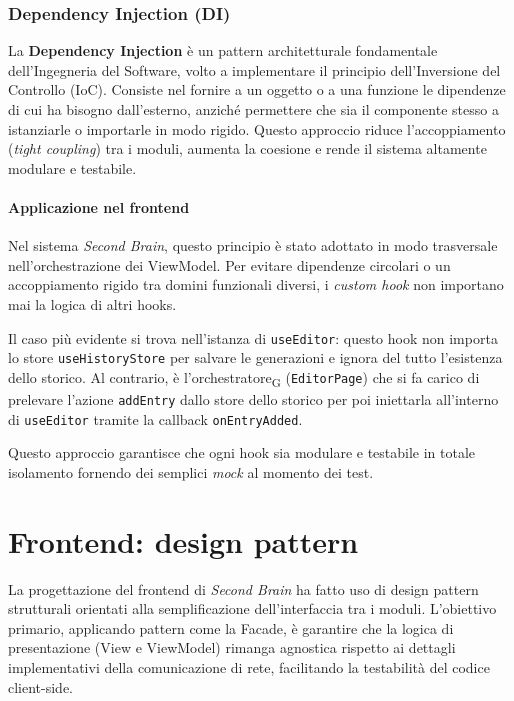 \documentclass[11pt,a4paper]{article}
\newcommand{\gls}[1]{#1\textsubscript{G}}
\begin{document}
\subsubsection{Dependency Injection (DI)}
La \textbf{Dependency Injection} è un pattern architetturale fondamentale dell'Ingegneria del Software, volto a implementare il principio dell'Inversione del Controllo (IoC). Consiste nel fornire a un oggetto o a una funzione le dipendenze di cui ha bisogno dall'esterno, anziché permettere che sia il componente stesso a istanziarle o importarle in modo rigido. Questo approccio riduce l'accoppiamento (\textit{tight coupling}) tra i moduli, aumenta la coesione e rende il sistema altamente modulare e testabile.

\paragraph{Applicazione nel frontend}
Nel sistema \textit{Second Brain}, questo principio è stato adottato in modo trasversale nell'orchestrazione dei ViewModel. Per evitare dipendenze circolari o un accoppiamento rigido tra domini funzionali diversi, i \textit{custom hook} non importano mai la logica di altri hooks.

Il caso più evidente si trova nell'istanza di \texttt{useEditor}: questo hook non importa lo store \texttt{useHistoryStore} per salvare le generazioni e ignora del tutto l'esistenza dello storico. Al contrario, è l'\gls{orchestratore} (\texttt{EditorPage}) che si fa carico di prelevare l'azione \texttt{addEntry} dallo store dello storico per poi iniettarla all'interno di \texttt{useEditor} tramite la callback \texttt{onEntryAdded}.

Questo approccio garantisce che ogni hook sia modulare e testabile in totale isolamento fornendo dei semplici \textit{mock} al momento dei test.


\newpage

\section{Frontend: design pattern}
La progettazione del frontend di \textit{Second Brain} ha fatto uso di design pattern strutturali orientati alla semplificazione dell'interfaccia tra i moduli. L'obiettivo primario, applicando pattern come la Facade, è garantire che la logica di presentazione (View e ViewModel) rimanga agnostica rispetto ai dettagli implementativi della comunicazione di rete, facilitando la testabilità del codice client-side.
\end{document}
